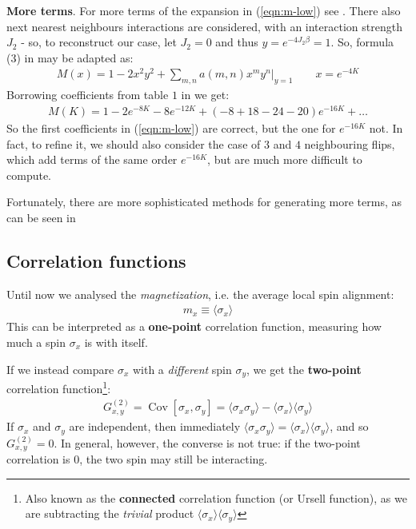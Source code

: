 \documentclass[../../main.tex]{subfiles}
\begin{document}
\begin{appr}\textbf{More terms}. For more terms of the expansion in (\ref{eqn:m-low}) see \cite{low-exp}. There also next nearest neighbours interactions are considered, with an interaction strength $J_2$ - so, to reconstruct our case, let $J_2 = 0$ and thus $y = e^{-4J_2 \beta} = 1$. So, formula (3) in \cite{low-exp} may be adapted as:
    \begin{align*}
        M(x) = 1-2x^2 y^2 + \sum_{m,n} a(m,n) x^m y^n \Big|_{y=1} \qquad x=e^{-4K}
    \end{align*}
    Borrowing coefficients from table $1$ in \cite{low-exp} we get:
    \begin{align*}
        M(K) = 1 - 2 e^{-8K} -8 e^{-12K} + (-8+ 18-24-20) e^{-16K} + \dots
    \end{align*}
    So the first coefficients in (\ref{eqn:m-low}) are correct, but the one for $e^{-16K}$ not. In fact, to refine it, we should also consider the case of $3$ and $4$ neighbouring flips, which add terms of the same order $e^{-16K}$, but are much more difficult to compute.

    \medskip

    Fortunately, there are more sophisticated methods for generating more terms, as can be seen in \cite{ising-low}
\end{appr}

\subsection{Correlation functions}
Until now we analysed the \textit{magnetization}, i.e. the average local spin alignment:
\begin{align*}
    m_x \equiv \langle \sigma_x \rangle
\end{align*} 
This can be interpreted as a \textbf{one-point} correlation function, measuring how much a spin $\sigma_x$ is  with itself.

\medskip

If we instead compare $\sigma_x$ with a \textit{different} spin $\sigma_y$, we get the \textbf{two-point} correlation function\footnote{Also known as the \textbf{connected} correlation function (or Ursell function), as we are subtracting the \textit{trivial} product $\langle \sigma_x \rangle \langle \sigma_y \rangle$}:
\begin{align}\label{eqn:two-point}
    G_{x,y}^{(2)} = \operatorname{Cov}[\sigma_x, \sigma_y] = \langle \sigma_x \sigma_y \rangle - \langle \sigma_x \rangle \langle \sigma_y \rangle
\end{align}   
If $\sigma_x$ and $\sigma_y$ are independent, then immediately $\langle \sigma_x \sigma_y \rangle = \langle \sigma_x \rangle \langle \sigma_y \rangle$, and so $G_{x,y}^{(2)} = 0$. In general, however, the converse is not true: if the two-point correlation is $0$, the two spin may still be interacting.
\end{document}
